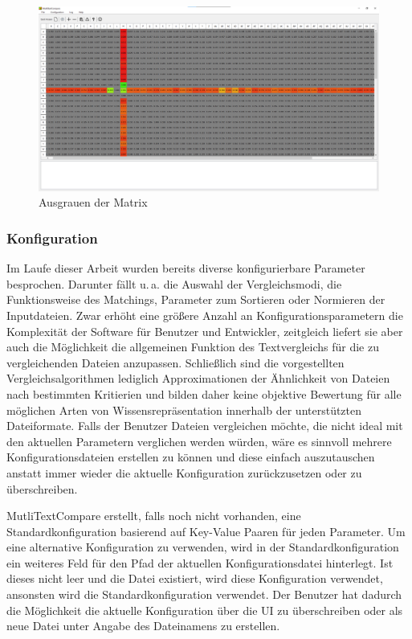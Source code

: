 \begin{figure}
    \centering
    \includegraphics[width=\textwidth]{images/Matrix_neu.png}
    \caption{Ausgrauen der Matrix}
    \label{fig:matrixGrau}
\end{figure}


\subsubsection{Konfiguration}

Im Laufe dieser Arbeit wurden bereits diverse konfigurierbare Parameter besprochen. Darunter fällt u.\,a. die Auswahl der Vergleichsmodi, die Funktionsweise des Matchings, Parameter zum Sortieren oder Normieren der Inputdateien. Zwar erhöht eine größere Anzahl an Konfigurationsparametern die Komplexität der Software für Benutzer und Entwickler, zeitgleich liefert sie aber auch die Möglichkeit die allgemeinen Funktion des Textvergleichs für die zu vergleichenden Dateien anzupassen. Schließlich sind die vorgestellten Vergleichsalgorithmen lediglich Approximationen der Ähnlichkeit von Dateien nach bestimmten Kritierien und bilden daher keine objektive Bewertung für alle möglichen Arten von Wissensrepräsentation innerhalb der unterstützten Dateiformate. Falls der Benutzer Dateien vergleichen möchte, die nicht ideal mit den aktuellen Parametern verglichen werden würden, wäre es sinnvoll mehrere Konfigurationsdateien erstellen zu können und diese einfach auszutauschen anstatt immer wieder die aktuelle Konfiguration zurückzusetzen oder zu überschreiben.

MutliTextCompare erstellt, falls noch nicht vorhanden, eine Standardkonfiguration basierend auf Key-Value Paaren für jeden Parameter. Um eine alternative Konfiguration zu verwenden, wird in der Standardkonfiguration ein weiteres Feld für den Pfad der aktuellen Konfigurationsdatei hinterlegt. Ist dieses nicht leer und die Datei existiert, wird diese Konfiguration verwendet, ansonsten wird die Standardkonfiguration verwendet. Der Benutzer hat dadurch die Möglichkeit die aktuelle Konfiguration über die UI zu überschreiben oder als neue Datei unter Angabe des Dateinamens zu erstellen.


